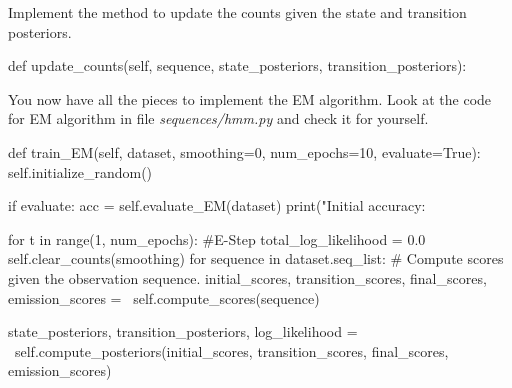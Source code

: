 \begin{exercise}

Implement the method to update the counts given the state and transition posteriors.
\begin{python}
 def update_counts(self, sequence, state_posteriors, transition_posteriors):
\end{python}




You now have all the pieces to implement the
EM algorithm. Look at the code for EM algorithm in file
\emph{sequences/hmm.py} and check it for yourself. 

\begin{python}
    def train_EM(self, dataset, smoothing=0, num_epochs=10, evaluate=True):
        self.initialize_random()

        if evaluate:
            acc = self.evaluate_EM(dataset)
            print("Initial accuracy: %
            
        for t in range(1, num_epochs):
            #E-Step
            total_log_likelihood = 0.0
            self.clear_counts(smoothing)
            for sequence in dataset.seq_list:
                # Compute scores given the observation sequence.
                initial_scores, transition_scores, final_scores, emission_scores = \
                    self.compute_scores(sequence)
                
                state_posteriors, transition_posteriors, log_likelihood = \
                    self.compute_posteriors(initial_scores,
                                            transition_scores,
                                            final_scores,
                                            emission_scores)


\end{python}
\end{exercise}
